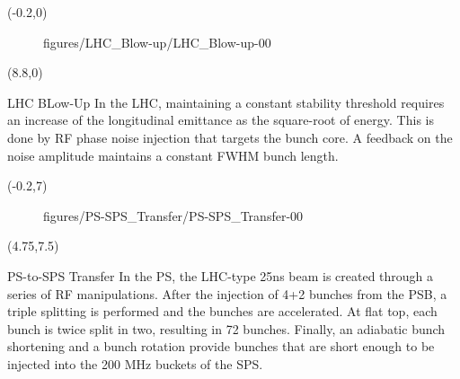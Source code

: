 \begin{frame}
		\begin{textblock}{9}(-0.2,0)
			\begin{figure}[h]
				 {figures/LHC_Blow-up/LHC_Blow-up-}{0}{0} %
			\end{figure}
		\end{textblock}
		\begin{textblock}{7.2}(8.8,0)
			\begin{block}{LHC BLow-Up}
				In the LHC, maintaining a constant stability threshold requires an increase of the longitudinal emittance as the square-root of energy. This is done by RF phase noise injection that targets the bunch core. 
				A feedback on the noise amplitude maintains a constant FWHM bunch length.
			\end{block}
		\end{textblock}
		\begin{textblock}{5}(-0.2,7)
			\begin{figure}[h]
				 {figures/PS-SPS_Transfer/PS-SPS_Transfer-}{0}{0} %
			\end{figure}
		\end{textblock}
		\begin{textblock}{11.2}(4.75,7.5)
			\begin{block}{PS-to-SPS Transfer}
				In the PS, the LHC-type 25ns beam is created through a series of RF manipulations. After the injection of 4+2 bunches from the PSB, a triple splitting is performed and the bunches are accelerated. At flat top, each bunch is twice split in two, resulting in 72 bunches. Finally, an adiabatic bunch shortening and a bunch rotation provide bunches that are short enough to be injected into the 200 MHz buckets of the SPS.
			\end{block}
		\end{textblock}

\end{frame}


